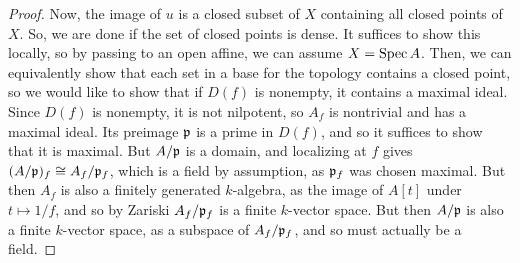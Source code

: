 \begin{proof}
	Now, the image of $u$ is a closed subset of $X$ containing all closed points of $X$. So, we are done if the set of closed points is dense. It suffices to show this locally, so by passing to an open affine, we can assume $X = \operatorname{Spec} A$. Then, we can equivalently show that each set in a base for the topology contains a closed point, so we would like to show that if $D(f)$ is nonempty, it contains a maximal ideal. Since $D(f)$ is nonempty, it is not nilpotent, so $A_f$ is nontrivial and has a maximal ideal. Its preimage $\mathfrak{p}$ is a prime in $D(f)$, and so it suffices to show that it is maximal. But $A/\mathfrak{p}$ is a domain, and localizing at $f$ gives $(A/\mathfrak{p})_f \cong A_f/\mathfrak{p}_f$, which is a field by assumption, as $\mathfrak{p}_f$ was chosen maximal. But then $A_f$ is also a finitely generated $k$-algebra, as the image of $A[t]$ under $t \mapsto 1/f$, and so by Zariski $A_f/\mathfrak{p}_f$ is a finite $k$-vector space. But then $A/\mathfrak{p}$ is also a finite $k$-vector space, as a subspace of $A_f/\mathfrak{p}_f$, and so must actually be a field.
\end{proof}
